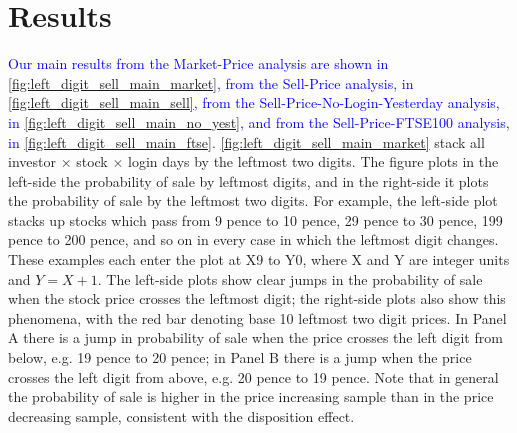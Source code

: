 \documentclass[
	USenglish,12pt,paper=a4,numbers=noenddot,abstract=on,
	final,%
	fullsample,
    ]{scrartcl}
\begin{document}
\section{Results}

\textcolor{blue}{Our main results from the Market-Price analysis are shown in \ref{fig:left_digit_sell_main_market}, from the Sell-Price analysis, in \ref{fig:left_digit_sell_main_sell}, from the Sell-Price-No-Login-Yesterday analysis, in \ref{fig:left_digit_sell_main_no_yest}, and from the Sell-Price-FTSE100 analysis, in \ref{fig:left_digit_sell_main_ftse}.} \ref{fig:left_digit_sell_main_market} stack all investor $\times$ stock $\times$ login days by the leftmost two digits. The figure plots in the left-side the probability of sale by leftmost digits, and in the right-side it plots the probability of sale by the leftmost two digits. For example, the left-side plot stacks up stocks which pass from 9 pence to 10 pence, 29 pence to 30 pence, 199 pence to 200 pence, and so on in every case in which the leftmost digit changes. These examples each enter the plot at X9 to Y0, where X and Y are integer units and $Y = X + 1$. The left-side plots show clear jumps in the probability of sale when the stock price crosses the leftmost digit; the right-side plots also show this phenomena, with the red bar denoting base 10 leftmost two digit prices. In Panel A there is a jump in probability of sale when the price crosses the left digit from below, e.g. 19 pence to 20 pence; in Panel B there is a jump when the price crosses the left digit from above, e.g. 20 pence to 19 pence. Note that in general the probability of sale is higher in the price increasing sample than in the price decreasing sample, consistent with the disposition effect. 
\end{document}
